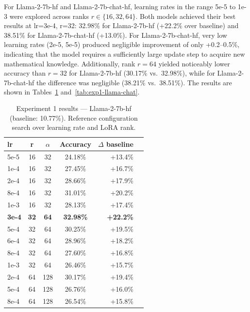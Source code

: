 For Llama-2-7b-hf and Llama-2-7b-chat-hf, learning rates in the
  range 5e-5 to 1e-3 were explored across ranks
  $r \in \{16, 32, 64\}$. Both models achieved their best results at
  lr=3e-4, r=32: 32.98\% for Llama-2-7b-hf (+22.2\% over
  baseline) and 38.51\% for Llama-2-7b-chat-hf (+13.0\%). For
  Llama-2-7b-chat-hf, very low learning rates (2e-5,
  5e-5) produced negligible improvement of only +0.2--0.5\%,
  indicating that the  model requires a sufficiently large
  update step to acquire new mathematical knowledge. Additionally, rank $r=64$ yielded
  noticeably lower accuracy than
  $r=32$ for Llama-2-7b-hf (30.17\% vs.\ 32.98\%), while for
  Llama-2-7b-chat-hf the difference was negligible (38.21\%
  vs.\ 38.51\%). The results are shown in Tables~\ref{tab:exp1-llama-hf}
  and~\ref{tab:exp1-llama-chat}.
\begin{table}[ht]
  \caption{Experiment 1 results --- Llama-2-7b-hf (baseline: 10.77\%). Reference configuration search over learning rate and LoRA rank.}
  \centering
  \footnotesize
  \begin{tabular}{lcccrr}
  \toprule
  \textbf{lr} & \textbf{r} & \textbf{$\alpha$} & \textbf{Accuracy} & \textbf{$\Delta$ baseline} \\
  \midrule
  5e-5 & 16 & 32 & 24.18\% & +13.4\% \\
  1e-4 & 16 & 32 & 27.45\% & +16.7\% \\
  2e-4 & 16 & 32 & 28.66\% & +17.9\% \\
  8e-4 & 16 & 32 & 31.01\% & +20.2\% \\
  1e-3 & 16 & 32 & 28.13\% & +17.4\% \\
  \midrule
  \textbf{3e-4} & \textbf{32} & \textbf{64} & \textbf{32.98\%} & \textbf{+22.2\%} \\
  5e-4 & 32 & 64 & 30.25\% & +19.5\% \\
  6e-4 & 32 & 64 & 28.96\% & +18.2\% \\
  8e-4 & 32 & 64 & 27.60\% & +16.8\% \\
  1e-3 & 32 & 64 & 26.46\% & +15.7\%\\
  \midrule
  2e-4 & 64 & 128 & 30.17\% & +19.4\% \\
  5e-4 & 64 & 128 & 26.76\% & +16.0\% \\
  8e-4 & 64 & 128 & 26.54\% & +15.8\% \\
  \bottomrule
  \end{tabular}

  \label{tab:exp1-llama-hf}
  \end{table}
  \hfill
